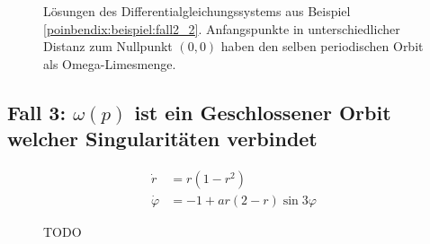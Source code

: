 \begin{figure}
\centering
    
    \caption{Lösungen des Differentialgleichungssystems aus Beispiel \ref{poinbendix:beispiel:fall2_2}.
    Anfangspunkte in unterschiedlicher Distanz zum Nullpunkt $(0,0)$ haben den selben periodischen Orbit als Omega-Limesmenge.}
\label{poinbendix:fig:fall_2_2}
\end{figure}

\subsection{Fall 3: $\omega(p)$ ist ein Geschlossener Orbit welcher Singularitäten verbindet} \label{poinbendix:subsection:fall3}
\begin{align*}
    \dot{r}       &= r(1-r^2) \\
    \dot{\varphi} &= -1 + ar(2-r) \sin 3\varphi
\end{align*}
\begin{figure}
\centering
    
    \caption{TODO} %
\label{poinbendix:fig:fall_2_2}
\end{figure}
